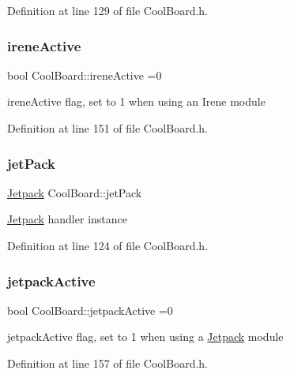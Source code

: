 Definition at line 129 of file Cool\+Board.\+h.

\mbox{\label{class_cool_board_a9c3f7ac625481ee2ae802a25d97a4ae0}} 
\subsubsection{\texorpdfstring{irene\+Active}{ireneActive}}
{\footnotesize\ttfamily bool Cool\+Board\+::irene\+Active =0\hspace{0.3cm}{\ttfamily [private]}}

irene\+Active flag, set to 1 when using an Irene module 

Definition at line 151 of file Cool\+Board.\+h.

\mbox{\label{class_cool_board_a30b1357881b01ccbec676856a91e48e9}} 
\subsubsection{\texorpdfstring{jet\+Pack}{jetPack}}
{\footnotesize\ttfamily \hyperlink{class_jetpack}{Jetpack} Cool\+Board\+::jet\+Pack\hspace{0.3cm}{\ttfamily [private]}}

\hyperlink{class_jetpack}{Jetpack} handler instance 

Definition at line 124 of file Cool\+Board.\+h.

\mbox{\label{class_cool_board_a9be03a913d26e558328935ca3b59a75e}} 
\subsubsection{\texorpdfstring{jetpack\+Active}{jetpackActive}}
{\footnotesize\ttfamily bool Cool\+Board\+::jetpack\+Active =0\hspace{0.3cm}{\ttfamily [private]}}

jetpack\+Active flag, set to 1 when using a \hyperlink{class_jetpack}{Jetpack} module 

Definition at line 157 of file Cool\+Board.\+h.

